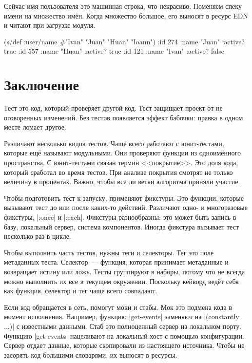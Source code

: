 Сейчас имя пользователя это машинная строка, что некрасиво. Поменяем спеку имени
на множество имён. Когда множество большое, его выносят в ресурс EDN и
читают при загрузке модуля.

\begin{english}
  \begin{clojure}
(s/def :user/name #{"Ivan" "Juan" "Huan" "Ioann"})
{:id 274 :name "Juan" :active? true}
{:id 557 :name "Huan" :active? true}
{:id 121 :name "Ivan" :active? false}
  \end{clojure}
\end{english}

\section{Заключение}

Тест это код, который проверяет другой код. Тест защищает проект от не
оговоренных изменений. Без тестов появляется эффект бабочки: правка в одном
месте ломает другое.


Различают несколько видов тестов. Чаще всего работают с юнит-тестами, которые
ещё называют модульными. Они проверяют функции из одноимённого пространства. С
юнит-тестами связан термин <<покрытие>>. Это доля кода, который сработал во
время тестов. При анализе покрытия смотрят не только величину в
процентах. Важно, чтобы все ли ветки алгоритма приняли участие.

Чтобы подготовить тест к запуску, применяют фикстуры. Это функции, которые
вызывают тест до или после каких-то действий. Различают одно- и многоразовые
фикстуры, \spverb|:once| и \spverb|:each|. Фикстуры разнообразны: это может быть
запись в базу, локальный сервер, система компонентов. Иногда фикстура вызывает
тест несколько раз в цикле.

Чтобы выполнить часть тестов, нужны теги и селекторы. Тег это поле метаданных
теста. Селектор~--- функция, которая принимает метаданные и возвращает истину
или ложь. Тесты группируют в наборы, потому что не всегда можно выполнить их все
в текущем окружении. Поскольку кейворд ведёт себя как функция, селектор и
тег чаще всего совпадают.

Если код обращается в сеть, помогут моки и стабы. Мок это подмена кода в момент
исполнения. Например, функцию \spverb|get-events| заменяют на
\spverb|(constantly {...})| с известными данными. Стаб это полноценный сервер на
локальном порту. Функцию \spverb|get-events| нацеливают на локальный хост с
помощью конфигурации. Сервер отдает данные, которые скопировали из настоящего
источника. Чтобы не засорять код большими словарями, их выносят в ресурсы.

